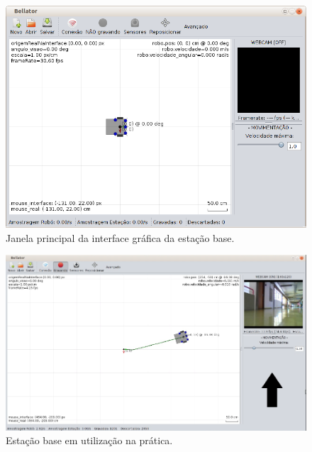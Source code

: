 \begin{figure}[H]
	\centering
	\includegraphics[width=1\textwidth]{./figuras/estacaoBase/interface_estacao_base1.png}
	\caption{Janela principal da interface gráfica da estação base.}
	\label{fig:interface_estacao_base1}
\end{figure}
\begin{figure}[H]
	\centering
	\includegraphics[width=1\textwidth]{./figuras/estacaoBase/interface_estacao_base2.png}
	\caption{Estação base em utilização na prática.}
	\label{fig:interface_estacao_base2}
\end{figure}